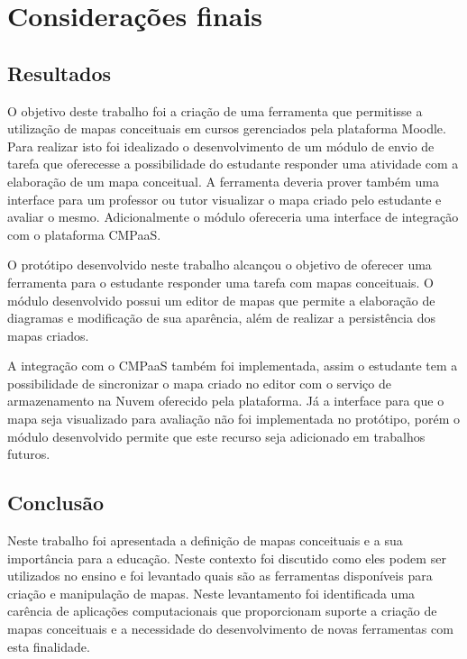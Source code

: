 \documentclass[
	12pt,				%
	openright,			%
	oneside,			%
	a4paper,			%
	english,			%
	french,				%
	spanish,			%
	brazil				%
	]{abntex2}
\begin{document}

\chapter{Considerações finais}

\section{Resultados}

O objetivo deste trabalho foi a criação de uma ferramenta que permitisse a utilização de mapas conceituais em cursos gerenciados pela plataforma Moodle. Para realizar isto foi idealizado o desenvolvimento de um módulo de envio de tarefa que oferecesse a possibilidade do estudante responder uma atividade com a elaboração de um mapa conceitual. A ferramenta deveria prover também uma interface para um professor ou tutor visualizar o mapa criado pelo estudante e avaliar o mesmo. Adicionalmente o módulo ofereceria uma interface de integração com o plataforma CMPaaS.

O protótipo desenvolvido neste trabalho alcançou o objetivo de oferecer uma ferramenta para o estudante responder uma tarefa com mapas  conceituais. O módulo desenvolvido possui um editor de mapas que permite a elaboração de diagramas e modificação de sua aparência, além de realizar a persistência dos mapas criados. 

A integração com o CMPaaS também foi implementada, assim o estudante tem a possibilidade de sincronizar o mapa criado no editor com o serviço de armazenamento na Nuvem oferecido pela plataforma. Já a interface para que o mapa seja visualizado para avaliação não foi implementada no protótipo, porém o módulo desenvolvido permite que este recurso seja adicionado em trabalhos futuros.  



\section{Conclusão}

Neste trabalho foi apresentada a definição de mapas conceituais e a sua importância para a educação. Neste contexto foi discutido como eles podem ser utilizados no ensino e foi levantado quais são as ferramentas disponíveis para criação e manipulação de mapas. Neste levantamento foi identificada uma carência de aplicações computacionais que proporcionam suporte a criação de mapas conceituais e a necessidade do desenvolvimento de novas ferramentas com esta finalidade.
\end{document}
